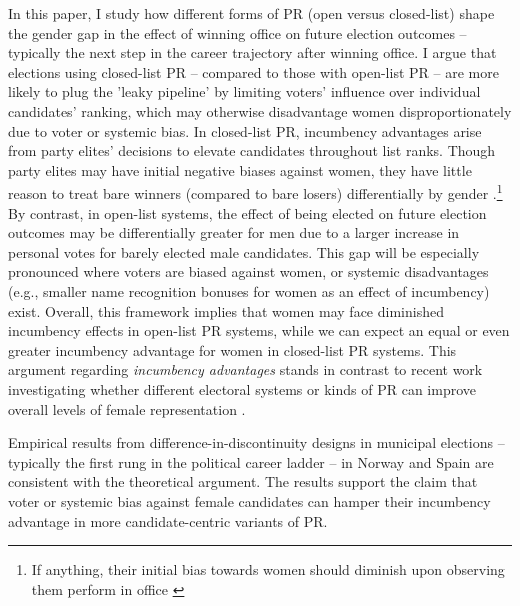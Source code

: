 \documentclass[12pt]{article}
\begin{document}
In this paper, I study how different forms of PR (open versus closed-list) shape the gender gap in the effect of winning office on future election outcomes -- typically the next step in the career trajectory after winning office. I argue that elections using closed-list PR -- compared to those with open-list PR -- are more likely to plug the 'leaky pipeline' by limiting voters' influence over individual candidates' ranking, which may otherwise disadvantage women disproportionately due to voter or systemic bias. In closed-list PR, incumbency advantages arise from party elites' decisions to elevate candidates throughout list ranks. Though party elites may have initial negative biases against women, they have little reason to treat bare winners (compared to bare losers) differentially by gender \citep{luhiste2015,hazan2006a}.\footnote{If anything, their initial bias towards women should diminish upon observing them perform in office \citep{kjaer2019}} By contrast, in open-list systems, the effect of being elected on future election outcomes may be differentially greater for men due to a larger increase in personal votes for barely elected male candidates. This gap will be especially pronounced where voters are biased against women, or systemic disadvantages (e.g., smaller name recognition bonuses for women as an effect of incumbency) exist. Overall, this framework implies that women may face diminished incumbency effects in open-list PR systems, while we can expect an equal or even greater incumbency advantage for women in closed-list PR systems. This argument regarding \emph{incumbency advantages} stands in contrast to recent work investigating whether different electoral systems or kinds of PR can improve overall levels of female representation \citep{stegmaier2014women,golder2017a}.

Empirical results from difference-in-discontinuity designs in municipal elections -- typically the first rung in the political career ladder \citep{cirone2020} -- in Norway and Spain are consistent with the theoretical argument. The results support the claim that voter or systemic bias against female candidates can hamper their incumbency advantage in more candidate-centric variants of PR.
\end{document}
